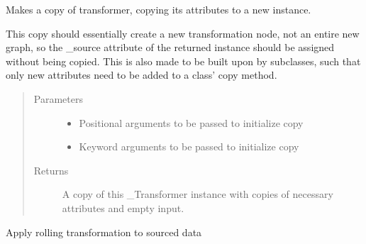 \documentclass[letterpaper,10pt,english]{sphinxmanual}
\begin{document}
\begin{fulllineitems}

\begin{fulllineitems}
\label{\detokenize{dalio.pipe:dalio.pipe.col_generation.Rolling.copy}}
Makes a copy of transformer, copying its attributes to a new
instance.

This copy should essentially create a new transformation node, not an
entire new graph, so the \_source attribute of the returned instance
should be assigned without being copied. This is also made to be built
upon by subclasses, such that only new attributes need to be added to
a class’ copy method.
\begin{quote}\begin{description}
\item[{Parameters}] \leavevmode\begin{itemize}
\item {} 
 \textendash{} Positional arguments to be passed to initialize copy

\item {} 
 \textendash{} Keyword arguments to be passed to initialize copy

\end{itemize}

\item[{Returns}] \leavevmode
A copy of this \_Transformer instance with copies of necessary
attributes and empty input.

\end{description}\end{quote}

\end{fulllineitems}


\begin{fulllineitems}
\label{\detokenize{dalio.pipe:dalio.pipe.col_generation.Rolling.transform}}
Apply rolling transformation to sourced data

\end{fulllineitems}


\end{fulllineitems}
\end{document}
